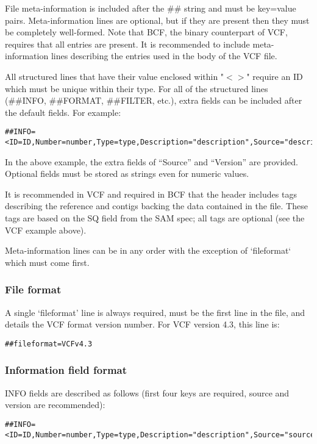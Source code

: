 \documentclass[8pt]{article}
\begin{document}
File meta-information is included after the \#\# string and must be key=value
pairs. Meta-information lines are optional, but if they are present then
they must be completely well-formed. Note that BCF, the binary
counterpart of VCF, requires that all entries are present.  It is recommended
to include meta-information lines describing the entries used in the
body of the VCF file.

All structured lines that have their value enclosed within "$<>$" require an ID
which must be unique within their type. For all of the structured lines (\#\#INFO, \#\#FORMAT,
\#\#FILTER, etc.), extra fields can be included after the default fields. For example:
\begin{verbatim}
##INFO=<ID=ID,Number=number,Type=type,Description="description",Source="description",Version="128">
\end{verbatim}
In the above example, the extra fields of ``Source'' and ``Version'' are
provided. Optional fields must be stored as strings even for numeric values.

It is recommended in VCF and required in BCF that the header
includes tags describing the reference and contigs backing the data contained in
the file.  These tags are based on the SQ field from the SAM spec; all tags are
optional (see the VCF example above).

Meta-information lines can be in any order with the exception of `fileformat`
which must come first.


\subsubsection{File format}
A single `fileformat' line is always required, must be the first line in the file, and details the VCF format version number. For VCF version 4.3, this line is:

\begin{verbatim}
##fileformat=VCFv4.3
\end{verbatim}



\subsubsection{Information field format}
INFO fields are described as follows (first four keys are required, source and version are recommended):

\begin{verbatim}
##INFO=<ID=ID,Number=number,Type=type,Description="description",Source="source",Version="version">
\end{verbatim}
\end{document}
